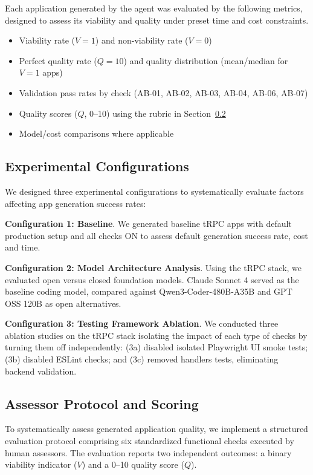 \documentclass{article}
\begin{document}
Each application generated by the agent was evaluated by the following metrics, designed to assess its viability and quality under preset time and cost constraints.

\begin{itemize}
\item Viability rate ($V=1$) and non-viability rate ($V=0$)
\item Perfect quality rate ($Q=10$) and quality distribution (mean/median for $V=1$ apps)
\item Validation pass rates by check (AB-01, AB-02, AB-03, AB-04, AB-06, AB-07)
\item Quality scores ($Q$, 0--10) using the rubric in Section~\ref{sec:scoring}
\item Model/cost comparisons where applicable
\end{itemize}

\subsection{Experimental Configurations}

We designed three experimental configurations to systematically evaluate factors affecting app generation success rates:

\textbf{Configuration 1: Baseline}. We generated baseline tRPC apps with default production setup and all checks ON to assess default generation success rate, cost and time.

\textbf{Configuration 2: Model Architecture Analysis}. Using the tRPC stack, we evaluated open versus closed foundation models. Claude Sonnet 4 served as the baseline coding model, compared against Qwen3-Coder-480B-A35B \citep{qwen2025qwen3} and GPT OSS 120B \citep{openai2025gpt} as open alternatives.

\textbf{Configuration 3: Testing Framework Ablation}. We conducted three ablation studies on the tRPC stack isolating the impact of each type of checks by turning them off independently: (3a) disabled isolated Playwright UI smoke tests; (3b) disabled ESLint checks; and (3c) removed handlers tests, eliminating backend validation.

\subsection{Assessor Protocol and Scoring}
\label{sec:scoring}

To systematically assess generated application quality, we implement a structured evaluation protocol comprising six standardized functional checks executed by human assessors. The evaluation reports two independent outcomes: a binary viability indicator ($V$) and a 0--10 quality score ($Q$).
\end{document}
